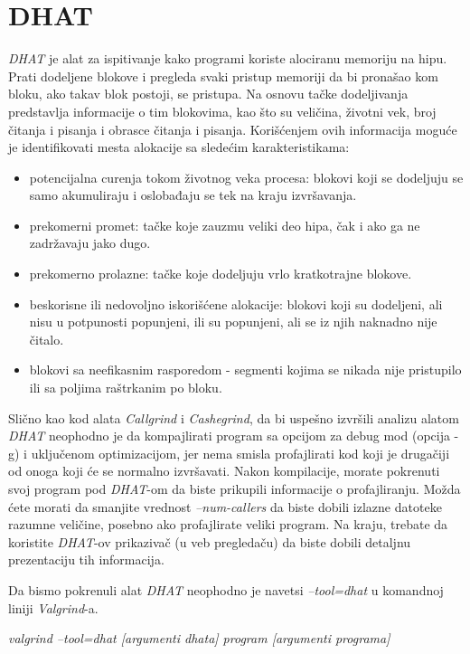 \documentclass[12pt,oneside]{memoir}
\theoremstyle{plain}
\theoremstyle{definition}
\begin{document}
\section{DHAT}
\textit{DHAT} je alat za ispitivanje kako programi koriste alociranu memoriju na hipu. Prati dodeljene blokove i pregleda svaki pristup memoriji da bi pronašao kom bloku, ako takav blok postoji, se pristupa. Na osnovu tačke dodeljivanja predstavlja informacije o tim blokovima, kao što su veličina, životni vek, broj čitanja i pisanja i obrasce čitanja i pisanja. Korišćenjem ovih informacija moguće je identifikovati mesta alokacije sa sledećim karakteristikama:
\begin{itemize}
\item potencijalna curenja tokom životnog veka procesa: blokovi koji se dodeljuju se samo akumuliraju i oslobađaju se tek na kraju izvršavanja.
\item prekomerni promet: tačke koje zauzmu veliki deo hipa, čak i ako ga ne zadržavaju jako dugo.
\item prekomerno prolazne: tačke koje dodeljuju vrlo kratkotrajne blokove.
\item beskorisne ili nedovoljno iskorišćene alokacije: blokovi koji su dodeljeni, ali nisu u potpunosti popunjeni, ili su popunjeni, ali se iz njih naknadno nije čitalo.
\item blokovi sa neefikasnim rasporedom - segmenti kojima se nikada nije pristupilo ili sa poljima raštrkanim po bloku.
\end{itemize}

Slično kao kod alata \textit{Callgrind} i \textit{Cashegrind}, da bi uspešno izvršili analizu alatom \textit{DHAT} neophodno je da kompajlirati program sa opcijom za debug mod (opcija -g) i uključenom optimizacijom, jer nema smisla profajlirati kod koji je drugačiji od onoga koji će se normalno izvršavati. Nakon kompilacije, morate pokrenuti svoj program pod \textit{DHAT}-om da biste prikupili informacije o profajliranju. Možda ćete morati da smanjite vrednost \textit{--num-callers} da biste dobili izlazne datoteke razumne veličine, posebno ako profajlirate veliki program. Na kraju, trebate da koristite\textit{ DHAT}-ov prikazivač (u veb pregledaču) da biste dobili detaljnu prezentaciju tih informacija.

Da bismo pokrenuli alat \textit{ DHAT} neophodno je navetsi \textit{–tool=dhat} u komandnoj liniji \textit{Valgrind}-a.
\begin{center}
\textit{valgrind --tool=dhat [argumenti dhata] program [argumenti programa]}
\end{center}
\end{document}
